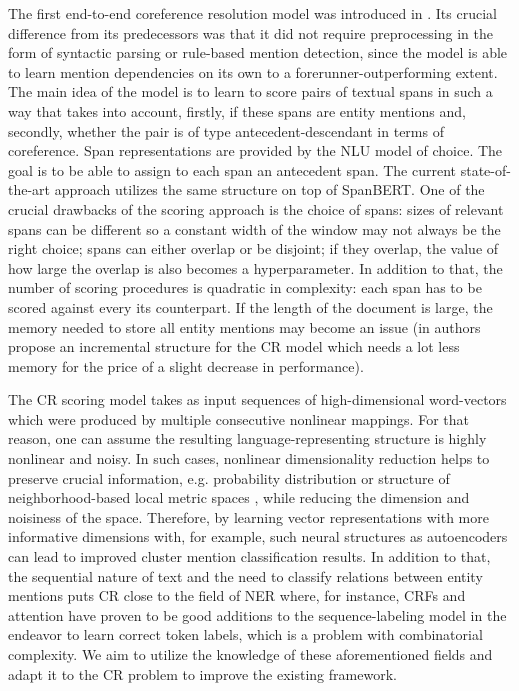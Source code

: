 The first end-to-end coreference resolution model was introduced in \cite{cr-Lee17}. Its crucial difference from its predecessors was that it did not require preprocessing in the form of syntactic parsing or rule-based mention detection, since the model is able to learn mention dependencies on its own to a forerunner-outperforming extent. 
The main idea of the model is to learn to score pairs of textual spans in such a way that takes into account, firstly, if these spans are entity mentions and, secondly, whether the pair is of type antecedent-descendant in terms of coreference.
Span representations are provided by the NLU model of choice. 
The goal is to be able to assign to each span an antecedent span. The current state-of-the-art approach \cite{cr-Joshi2019} utilizes the same structure on top of SpanBERT. One of the crucial drawbacks of the scoring approach is the choice of spans: sizes of relevant spans can be different so a constant width of the window may not always be the right choice; spans can either overlap or be disjoint; if they overlap, the value of how large the overlap is also becomes a hyperparameter. In addition to that, the number of scoring procedures is quadratic in complexity: each span has to be scored against every its counterpart. If the length of the document is large, the memory needed to store all entity mentions may become an issue (in \cite{cr-Xia2020} authors propose an incremental structure for the CR model which needs a lot less memory for the price of a slight decrease in performance). 

The CR scoring model takes as input sequences of high-dimensional word-vectors which were produced by multiple consecutive nonlinear mappings. For that reason, one can assume the resulting language-representing structure is highly nonlinear and noisy. 
In such cases, nonlinear dimensionality reduction helps to preserve crucial information, e.g. probability distribution \cite{dr-VanderMaaten2014} or structure of neighborhood-based local metric spaces \cite{dr-McInnes2018}, while reducing the dimension and noisiness of the space. 
Therefore, by learning vector representations with more informative dimensions with, for example, such neural structures as autoencoders \cite{autoencoders-Zabalza2016,autoencoders-Sahay2019} can lead to improved cluster mention classification results. 
In addition to that, the sequential nature of text and the need to classify relations between entity mentions puts CR close to the field of NER where, for instance, CRFs \cite{ner-Strakova2019,ner-Zhanming2019} and attention \cite{ner-Yamada2020} have proven to be good additions  to the sequence-labeling model in the endeavor to learn correct token labels, which is a problem with combinatorial complexity. 
We aim to utilize the knowledge of these aforementioned fields and adapt it to the CR problem to improve the existing framework.

